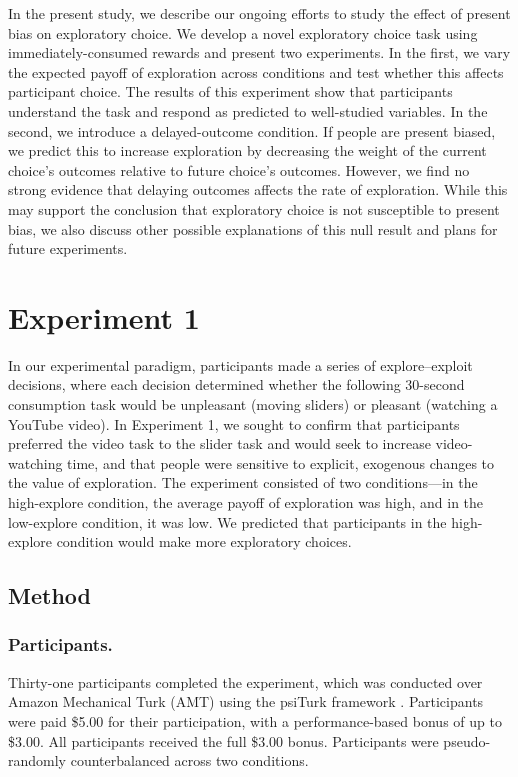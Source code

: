 \documentclass[10pt,letterpaper]{article}
\begin{document}
In the present study, we describe our ongoing efforts to study the effect of present bias
on exploratory choice. We develop a novel exploratory choice task using
immediately-consumed rewards and present two experiments. In the first, we vary
the expected payoff of exploration across conditions and test whether this affects
participant choice. The results of this experiment show that participants understand the task and respond
as predicted to well-studied variables. In the second, we introduce a
delayed-outcome condition. If people are present biased, we predict this to
increase exploration by decreasing the weight of the current choice's outcomes
relative to future choice's outcomes.
However, we find no strong evidence that delaying outcomes affects
the rate of exploration. While this may support the conclusion that exploratory
choice is not susceptible to present bias, we also discuss other possible
explanations of this null result and plans for future experiments.

\section{Experiment 1}

In our experimental paradigm, participants made a series of explore--exploit
decisions, where each decision determined whether the following 30-second
consumption task would be unpleasant (moving sliders) or pleasant (watching a
YouTube video). In Experiment 1, we sought to confirm that participants preferred
the video task to the slider task and would seek to increase video-watching
time, and that people were sensitive to explicit, exogenous changes to the value
of exploration. The experiment consisted of two conditions---in the high-explore
condition, the average payoff of exploration was high, and in the low-explore
condition, it was low. We predicted that participants in the high-explore condition
would make more exploratory choices.

\subsection{Method}

\subsubsection{Participants.}

Thirty-one participants completed the experiment, which was conducted over
Amazon Mechanical Turk (AMT) using the psiTurk framework \citep{Gureckis2015a}.
Participants were paid \$5.00 for their participation, with a performance-based
bonus of up to \$3.00. All participants received the full \$3.00 bonus.
Participants were pseudo-randomly counterbalanced across two conditions.
\end{document}
